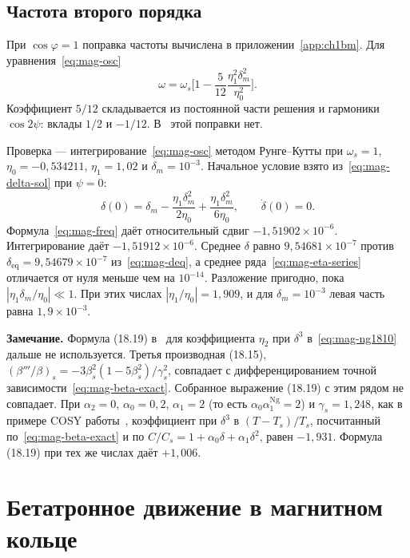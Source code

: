 \documentclass[aps,pra,preprint,a4paper,amsmath,amssymb,longbibliography]{revtex4-2}
\newcommand{\zamech}[1]{\par\medskip\noindent\textbf{Замечание.} #1\par\medskip}
\begin{document}
\subsection{Частота второго порядка}
\label{sec:frequency}

При $\cos\varphi=1$ поправка частоты вычислена в приложении~\ref{app:ch1bm}. Для уравнения~\eqref{eq:mag-osc}
\begin{equation}
\label{eq:mag-freq}
\omega
=\omega_s\Biggl[1-\frac{5}{12}\frac{\eta_1^2\delta_m^2}{\eta_0^2}\Biggr].
\end{equation}
Коэффициент $5/12$ складывается из постоянной части решения и гармоники $\cos 2\psi$: вклады $1/2$ и $-1/12$. В~\cite{Senichev2013} этой поправки нет.

Проверка --- интегрирование~\eqref{eq:mag-osc} методом Рунге--Кутты при $\omega_s=1$, $\eta_0=-0{,}534211$, $\eta_1=1{,}02$ и $\delta_m=10^{-3}$. Начальное условие взято из~\eqref{eq:mag-delta-sol} при $\psi=0$:
\begin{equation}
\label{eq:mag-ic}
\delta(0)
=\delta_m-\frac{\eta_1\delta_m^2}{2\eta_0}+\frac{\eta_1\delta_m^2}{6\eta_0},
\qquad
\dot\delta(0)=0.
\end{equation}
Формула~\eqref{eq:mag-freq} даёт относительный сдвиг $-1{,}51902\times 10^{-6}$. Интегрирование даёт $-1{,}51912\times 10^{-6}$. Среднее $\delta$ равно $9{,}54681\times 10^{-7}$ против $\delta_{\mathrm{eq}}=9{,}54679\times 10^{-7}$ из~\eqref{eq:mag-deq}, а среднее ряда~\eqref{eq:mag-eta-series} отличается от нуля меньше чем на $10^{-14}$. Разложение пригодно, пока $|\eta_1\delta_m/\eta_0|\ll 1$. При этих числах $|\eta_1/\eta_0|=1{,}909$, и для $\delta_m=10^{-3}$ левая часть равна $1{,}9\times 10^{-3}$.

\zamech{Формула (18.19) в~\cite{Ng2006} для коэффициента $\eta_2$ при $\delta^3$ в~\eqref{eq:mag-ng1810} дальше не используется. Третья производная (18.15), $(\beta'''/\beta)_s=-3\beta_s^2(1-5\beta_s^2)/\gamma_s^2$, совпадает с дифференцированием точной зависимости~\eqref{eq:mag-beta-exact}. Собранное выражение (18.19) с этим рядом не совпадает. При $\alpha_2=0$, $\alpha_0=0{,}2$, $\alpha_1=2$ (то есть $\alpha_0\alpha_1^{\mathrm{Ng}}=2$) и $\gamma_s=1{,}248$, как в примере COSY работы~\cite{Senichev2013}, коэффициент при $\delta^3$ в $(T-T_s)/T_s$, посчитанный по~\eqref{eq:mag-beta-exact} и по $C/C_s=1+\alpha_0\delta+\alpha_1\delta^2$, равен $-1{,}931$. Формула (18.19) при тех же числах даёт $+1{,}006$.}
\section{Бетатронное движение в магнитном кольце}
\label{sec:ch2}
\end{document}
